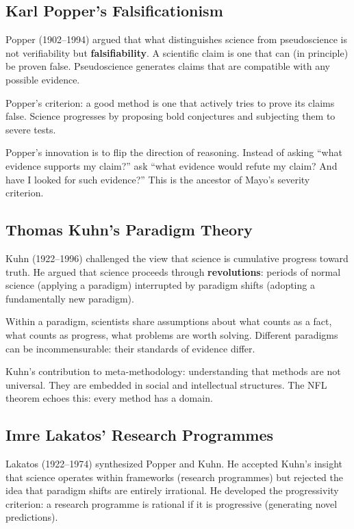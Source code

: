 \documentclass[11pt,letterpaper]{article}
\begin{document}
\subsection*{Karl Popper's Falsificationism}

Popper (1902--1994) argued that what distinguishes science from pseudoscience is not verifiability but \textbf{falsifiability}. A scientific claim is one that can (in principle) be proven false. Pseudoscience generates claims that are compatible with any possible evidence.

Popper's criterion: a good method is one that actively tries to prove its claims false. Science progresses by proposing bold conjectures and subjecting them to severe tests.

Popper's innovation is to flip the direction of reasoning. Instead of asking ``what evidence supports my claim?'' ask ``what evidence would refute my claim? And have I looked for such evidence?'' This is the ancestor of Mayo's severity criterion.

\subsection*{Thomas Kuhn's Paradigm Theory}

Kuhn (1922--1996) challenged the view that science is cumulative progress toward truth. He argued that science proceeds through \textbf{revolutions}: periods of normal science (applying a paradigm) interrupted by paradigm shifts (adopting a fundamentally new paradigm).

Within a paradigm, scientists share assumptions about what counts as a fact, what counts as progress, what problems are worth solving. Different paradigms can be incommensurable: their standards of evidence differ.

Kuhn's contribution to meta-methodology: understanding that methods are not universal. They are embedded in social and intellectual structures. The NFL theorem echoes this: every method has a domain.

\subsection*{Imre Lakatos' Research Programmes}

Lakatos (1922--1974) synthesized Popper and Kuhn. He accepted Kuhn's insight that science operates within frameworks (research programmes) but rejected the idea that paradigm shifts are entirely irrational. He developed the progressivity criterion: a research programme is rational if it is progressive (generating novel predictions).
\end{document}
